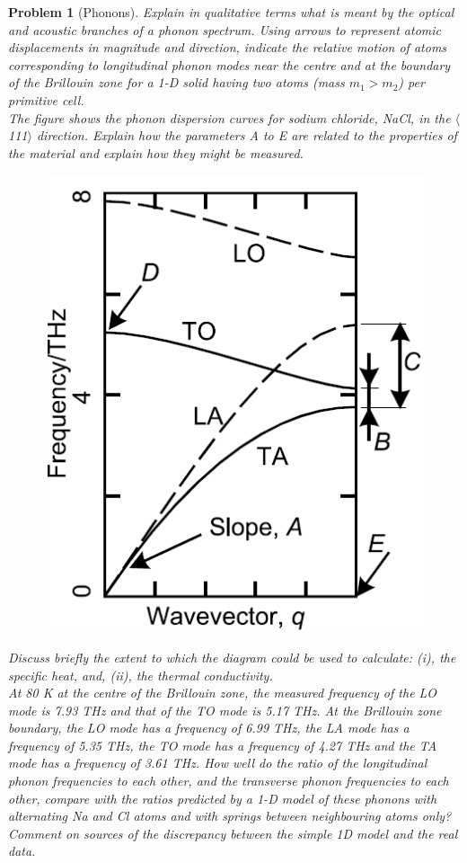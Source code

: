 \documentclass[a4paper]{article}
\theoremstyle{new}
\newtheorem{qns}{Problem}[section]
\begin{document}
\newpage
\begin{qns}[Phonons]
Explain in qualitative terms what is meant by the optical and acoustic branches of a phonon spectrum. Using arrows to represent atomic displacements in magnitude and direction, indicate the relative motion of atoms corresponding to longitudinal phonon modes near the centre and at the boundary of the Brillouin zone for a 1-D solid having two atoms (mass $m_1>m_2$) per primitive cell.\\[5pt]
The figure shows the phonon dispersion curves for sodium chloride, NaCl, in the $\langle$111$\rangle$ direction. Explain how the parameters A to E are related to the properties of the material and explain how they might be measured.
\begin{figure}[H]
    \centering
    \includegraphics[scale=0.5]{4_4.PNG}
\end{figure}
Discuss briefly the extent to which the diagram could be used to calculate: (i), the specific heat, and, (ii), the thermal conductivity.\\[5pt]
At 80 K at the centre of the Brillouin zone, the measured frequency of the LO mode is 7.93 THz and that of the TO mode is 5.17 THz. At the Brillouin zone boundary, the LO mode has a frequency of 6.99 THz, the LA mode has a frequency of 5.35 THz, the TO mode has a frequency of 4.27 THz and the TA mode has a frequency of 3.61 THz. How well do the ratio of the longitudinal phonon frequencies to each other, and the transverse phonon frequencies to each other, compare with the ratios predicted by a 1-D model of these phonons with alternating Na and Cl atoms and with springs between neighbouring atoms only? Comment on sources of the discrepancy between the simple 1D model and the real data.
\end{qns}
\end{document}
